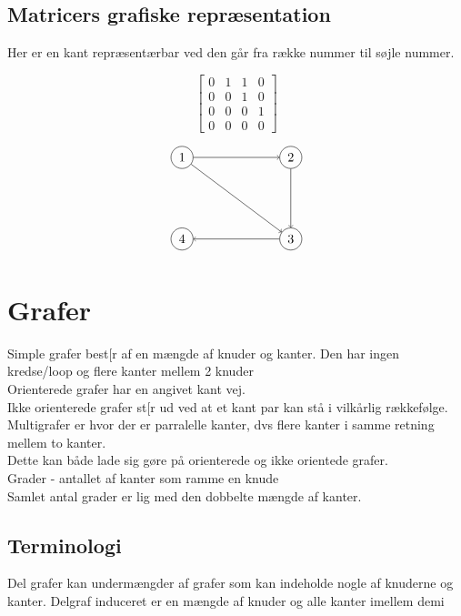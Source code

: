 \documentclass[12pt, a4paper]{article}
\begin{document}
		\subsection{Matricers grafiske repræsentation}
			Her er en kant repræsentærbar ved den går fra række nummer til søjle nummer.\\
			\begin{minipage}{0.45\textwidth}
				$$\begin{bmatrix}0&1&1&0\\0&0&1&0\\0&0&0&1\\0&0&0&0\end{bmatrix}$$
			\end{minipage}
			\hfill
			\begin{minipage}{0.45\textwidth}
				$$\begin{tikzpicture}[scale=3]
						\tikzstyle{vertex}=[circle,draw=black]
						\node[vertex](v1) at (0,0.75) {1};
						\node[vertex](v2) at (1,0.75) {2};
						\node[vertex](v3) at (1,0) {3};
						\node[vertex](v4) at (0,0) {4};
						\draw[->](v1) -- (v2);
						\draw[->](v1) -- (v3);
						\draw[->](v2) -- (v3);
						\draw[->](v3) -- (v4);
					\end{tikzpicture}$$
			\end{minipage}
	\section{Grafer}
		Simple grafer best[r af en mængde af knuder og kanter. Den har ingen kredse/loop og flere kanter mellem 2 knuder\\
		Orienterede grafer har en angivet kant vej.\\
		Ikke orienterede grafer st[r ud ved at et kant par kan stå i vilkårlig rækkefølge.\\
		Multigrafer er hvor der er parralelle kanter, dvs flere kanter i samme retning mellem to kanter.\\
		Dette kan både lade sig gøre på orienterede og ikke orientede grafer.\\
		Grader - antallet af kanter som ramme en knude\\
		Samlet antal grader er lig med den dobbelte mængde af kanter.
		\subsection{Terminologi}
			Del grafer kan undermængder af grafer som kan indeholde nogle af knuderne og kanter.
			Delgraf induceret er en mængde af knuder og alle kanter imellem demi
\end{document}
